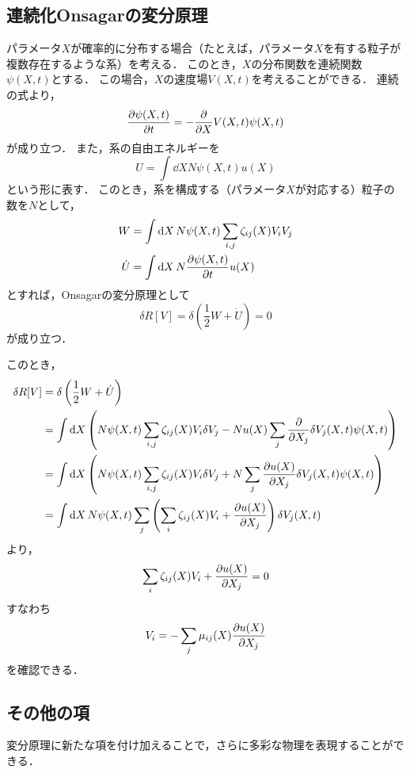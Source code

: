 \documentclass[a4paper,11pt]{jsarticle}
\begin{document}
\subsection{連続化Onsagarの変分原理}
パラメータ$X$が確率的に分布する場合（たとえば，パラメータ$X$を有する粒子が複数存在するような系）を考える．
このとき，$X$の分布関数を連続関数$\psi(X,t)$とする．
この場合，$X$の速度場$V(X,t)$を考えることができる．
連続の式より，
\begin{equation}
  \pdv{\psi(X,t)}{t} = -\pdv{X} V(X,t)\psi(X,t) 
\end{equation}
が成り立つ．
また，系の自由エネルギーを
\begin{equation}
  U = \int \dd{X} N\psi(X,t) u(X)
\end{equation}
という形に表す．
このとき，系を構成する（パラメータ$X$が対応する）粒子の数を$N$として，
\begin{align}
  W &= \int \dd{X} N\psi(X,t) \sum_{i,j} \zeta_{ij}(X) V_{i} V_{j} \\
  \dot{U} &= \int \dd{X} N\pdv{\psi(X,t)}{t} u(X) 
\end{align}
とすれば，Onsagarの変分原理として
\begin{equation}
  \delta R[V] = \delta \left( \frac{1}{2} W + \dot{U}\right) = 0
\end{equation}
が成り立つ．

このとき，
\begin{align}
  \delta R[V] &= \delta \left( \frac{1}{2} W + \dot{U}\right) \notag\\
  &= \int \dd{X} \left(N\psi(X,t) \sum_{i,j} \zeta_{ij}(X) V_{i} \delta V_{j} 
  -  N u(X) \sum_{j} \pdv{X_j} \delta V_j(X,t) \psi(X,t)
  \right) \notag \\
  &= \int \dd{X} \left(N\psi(X,t) \sum_{i,j} \zeta_{ij}(X) V_{i} \delta V_{j} 
  + N \sum_{j} \pdv{u(X)}{X_j} \delta V_j(X,t) \psi(X,t)
  \right) \notag \\
  &=\int \dd{X} N\psi(X,t) \sum_{j}\left( \sum_{i} \zeta_{ij}(X) V_{i} 
  + \pdv{u(X)}{X_j} \right) \delta V_j(X,t) 
\end{align}
より，
\begin{equation}
  \sum_{i} \zeta_{ij}(X) V_{i} 
  + \pdv{u(X)}{X_j} = 0
\end{equation}
すなわち
\begin{equation}
  V_{i} = - \sum_{j} \mu_{ij}(X) \pdv{u(X)}{X_j}
\end{equation}
を確認できる．

\subsection{その他の項}
変分原理に新たな項を付け加えることで，さらに多彩な物理を表現することができる．
\end{document}
